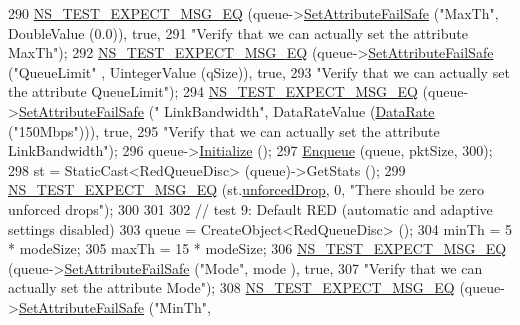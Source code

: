 \begin{DoxyCode}
290   \hyperlink{group__testing_ga7304ba46a28d8cf08dfdfd6499cf7068}{NS\_TEST\_EXPECT\_MSG\_EQ} (queue->\hyperlink{classns3_1_1ObjectBase_aa7d333004e970f925a4ed5df275541b5}{SetAttributeFailSafe} (\textcolor{stringliteral}{"MaxTh"}, 
      DoubleValue (0.0)), \textcolor{keyword}{true},
291                          \textcolor{stringliteral}{"Verify that we can actually set the attribute MaxTh"});
292   \hyperlink{group__testing_ga7304ba46a28d8cf08dfdfd6499cf7068}{NS\_TEST\_EXPECT\_MSG\_EQ} (queue->\hyperlink{classns3_1_1ObjectBase_aa7d333004e970f925a4ed5df275541b5}{SetAttributeFailSafe} (\textcolor{stringliteral}{"QueueLimit"}
      , UintegerValue (qSize)), \textcolor{keyword}{true},
293                          \textcolor{stringliteral}{"Verify that we can actually set the attribute QueueLimit"});
294   \hyperlink{group__testing_ga7304ba46a28d8cf08dfdfd6499cf7068}{NS\_TEST\_EXPECT\_MSG\_EQ} (queue->\hyperlink{classns3_1_1ObjectBase_aa7d333004e970f925a4ed5df275541b5}{SetAttributeFailSafe} (\textcolor{stringliteral}{"
      LinkBandwidth"}, DataRateValue (\hyperlink{classns3_1_1DataRate}{DataRate} (\textcolor{stringliteral}{"150Mbps"}))), \textcolor{keyword}{true},
295                          \textcolor{stringliteral}{"Verify that we can actually set the attribute LinkBandwidth"});
296   queue->\hyperlink{classns3_1_1Object_af4411cb29971772fcd09203474a95078}{Initialize} ();
297   \hyperlink{classAredQueueDiscTestCase_a5528c44233e1056913e76d5be988f049}{Enqueue} (queue, pktSize, 300);
298   st = StaticCast<RedQueueDisc> (queue)->GetStats ();
299   \hyperlink{group__testing_ga7304ba46a28d8cf08dfdfd6499cf7068}{NS\_TEST\_EXPECT\_MSG\_EQ} (st.\hyperlink{structns3_1_1RedQueueDisc_1_1Stats_a242027f6eb7d30e2cd636c52080e2c73}{unforcedDrop}, 0, \textcolor{stringliteral}{"There should be zero
       unforced drops"});
300 
301 
302   \textcolor{comment}{// test 9: Default RED (automatic and adaptive settings disabled)}
303   queue = CreateObject<RedQueueDisc> ();
304   minTh = 5 * modeSize;
305   maxTh = 15 * modeSize;
306   \hyperlink{group__testing_ga7304ba46a28d8cf08dfdfd6499cf7068}{NS\_TEST\_EXPECT\_MSG\_EQ} (queue->\hyperlink{classns3_1_1ObjectBase_aa7d333004e970f925a4ed5df275541b5}{SetAttributeFailSafe} (\textcolor{stringliteral}{"Mode"}, mode
      ), \textcolor{keyword}{true},
307                          \textcolor{stringliteral}{"Verify that we can actually set the attribute Mode"});
308   \hyperlink{group__testing_ga7304ba46a28d8cf08dfdfd6499cf7068}{NS\_TEST\_EXPECT\_MSG\_EQ} (queue->\hyperlink{classns3_1_1ObjectBase_aa7d333004e970f925a4ed5df275541b5}{SetAttributeFailSafe} (\textcolor{stringliteral}{"MinTh"}, 

\end{DoxyCode}
